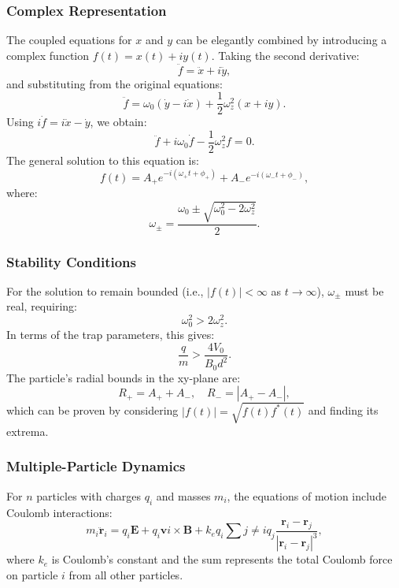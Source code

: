 \documentclass[english,notitlepage,reprint,nofootinbib]{revtex4-2}  %
\begin{document}
\subsubsection{Complex Representation}
The coupled equations for $x$ and $y$ can be elegantly combined by introducing a complex function $f(t) = x(t) + iy(t)$. Taking the second derivative:
\begin{equation}
\ddot{f} = \ddot{x} + i\ddot{y},
\end{equation}
and substituting from the original equations:
\begin{equation}
\ddot{f} = \omega_0(\dot{y} - i\dot{x}) + \frac{1}{2}\omega_z^2(x + iy).
\end{equation}
Using $i\dot{f} = i\dot{x} - \dot{y}$, we obtain:
\begin{equation}
\ddot{f} + i\omega_0\dot{f} - \frac{1}{2}\omega_z^2f = 0.
\end{equation}
The general solution to this equation is:
\begin{equation}
f(t) = A_+ e^{-i(\omega_+ t + \phi_+)} + A_- e^{-i(\omega_- t + \phi_-)},
\end{equation}
where:
\begin{equation}
\omega_\pm = \frac{\omega_0 \pm \sqrt{\omega_0^2 - 2\omega_z^2}}{2}.
\end{equation}
\subsubsection{Stability Conditions}
For the solution to remain bounded (i.e., $|f(t)| < \infty$ as $t\to\infty$), $\omega_\pm$ must be real, requiring:
\begin{equation}
\omega_0^2 > 2\omega_z^2.
\end{equation}
In terms of the trap parameters, this gives:
\begin{equation}
\frac{q}{m} > \frac{4V_0}{B_0d^2}.
\end{equation}
The particle's radial bounds in the xy-plane are:
\begin{equation}
R_+ = A_+ + A_-, \quad R_- = |A_+ - A_-|,
\end{equation}
which can be proven by considering $|f(t)| = \sqrt{f(t)f^*(t)}$ and finding its extrema.
\subsubsection{Multiple-Particle Dynamics}
For $n$ particles with charges ${q_i}$ and masses ${m_i}$, the equations of motion include Coulomb interactions:
\begin{equation}
m_i\ddot{\mathbf{r}}_i = q_i\mathbf{E} + q_i\mathbf{v}i\times \mathbf{B} + k_e q_i\sum{j\neq i}q_j \frac{\mathbf{r}_i-\mathbf{r}_j}{|\mathbf{r}_i - \mathbf{r}_j|^3},
\end{equation}
where $k_e$ is Coulomb's constant and the sum represents the total Coulomb force on particle $i$ from all other particles.
\end{document}
